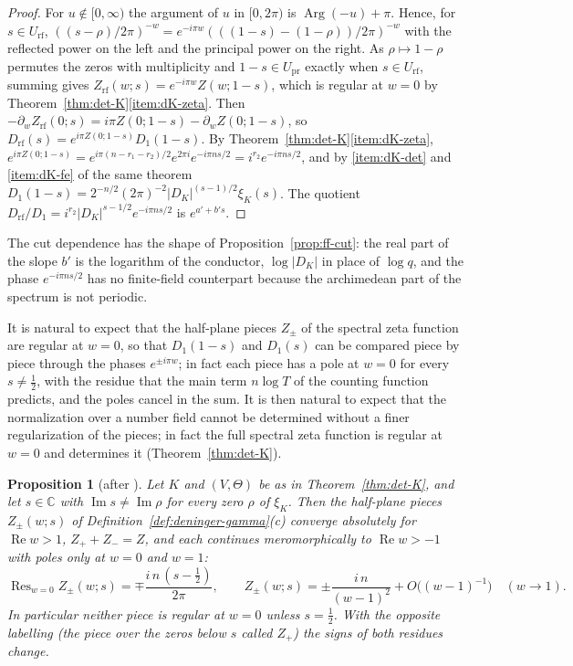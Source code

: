 \documentclass[11pt]{amsart}
\theoremstyle{plain}
\newtheorem{proposition}[theorem]{Proposition}
\theoremstyle{definition}
\theoremstyle{remark}
\numberwithin{equation}{section}
\newcommand{\C}{\mathbb{C}}
\DeclareMathOperator{\Ima}{Im}
\DeclareMathOperator{\Rea}{Re}
\renewcommand{\Re}{\Rea}
\renewcommand{\Im}{\Ima}
\begin{document}
\begin{proof}
For $u\notin[0,\infty)$ the argument of $u$ in $[0,2\pi)$ is
$\operatorname{Arg}(-u)+\pi$. Hence, for $s\in U_{\mathrm{rf}}$,
$((s-\rho)/2\pi)^{-w}=e^{-i\pi w}(((1-s)-(1-\rho))/2\pi)^{-w}$ with the
reflected power on the left and the principal power on the right. As
$\rho\mapsto1-\rho$ permutes the zeros with multiplicity and
$1-s\in U_{\mathrm{pr}}$ exactly when $s\in U_{\mathrm{rf}}$, summing
gives $Z_{\mathrm{rf}}(w;s)=e^{-i\pi w}Z(w;1-s)$, which is regular at
$w=0$ by Theorem~\ref{thm:det-K}\ref{item:dK-zeta}. Then
$-\partial_wZ_{\mathrm{rf}}(0;s)=i\pi Z(0;1-s)-\partial_wZ(0;1-s)$, so
$D_{\mathrm{rf}}(s)=e^{i\pi Z(0;1-s)}D_1(1-s)$. By
Theorem~\ref{thm:det-K}\ref{item:dK-zeta},
$e^{i\pi Z(0;1-s)}=e^{i\pi(n-r_1-r_2)/2}e^{2\pi i}e^{-i\pi ns/2}
=i^{r_2}e^{-i\pi ns/2}$, and by \ref{item:dK-det} and
\ref{item:dK-fe} of the same theorem
$D_1(1-s)=2^{-n/2}(2\pi)^{-2}|D_K|^{(s-1)/2}\xi_K(s)$. The quotient
$D_{\mathrm{rf}}/D_1=i^{r_2}|D_K|^{s-1/2}e^{-i\pi ns/2}$ is
$e^{a'+b's}$.
\end{proof}

The cut dependence has the shape of Proposition~\ref{prop:ff-cut}: the
real part of the slope $b'$ is the logarithm of the conductor, $\log
|D_K|$ in place of $\log q$, and the phase $e^{-i\pi ns/2}$ has no
finite-field counterpart because the archimedean part of the spectrum
is not periodic.

It is natural to expect that the half-plane pieces $Z_\pm$ of the
spectral zeta function are regular at $w=0$, so that $D_1(1-s)$ and
$D_1(s)$ can be compared piece by piece through the phases
$e^{\pm i\pi w}$; in fact each piece has a pole at $w=0$ for every
$s\ne\tfrac12$, with the residue that the main term
$n\log T$ of the counting function predicts, and the poles cancel in
the sum. It is then natural to expect that the normalization over a
number field cannot be determined without a finer regularization of
the pieces; in fact the full spectral zeta function is regular at $w=0$
and determines it (Theorem~\ref{thm:det-K}).

\begin{proposition}[{after \cite[(1.3)--(1.7), pp.~4--6, and
Theorem~(7.20), p.~37]{Deninger1994Motivic}}]\label{prop:Zpm}
Let $K$ and $(V,\Theta)$ be as in Theorem~\ref{thm:det-K}, and let
$s\in\C$ with $\Im s\ne\Im\rho$ for every zero $\rho$ of $\xi_K$. Then
the half-plane pieces $Z_\pm(w;s)$ of
Definition~\ref{def:deninger-gamma}(c) converge absolutely for
$\Re w>1$, $Z_++Z_-=Z$, and each continues meromorphically to
$\Re w>-1$ with poles only at $w=0$ and $w=1$:
\[
\operatorname{Res}_{w=0}Z_\pm(w;s)=\mp\frac{i\,n\,(s-\frac12)}{2\pi},
\qquad
Z_\pm(w;s)=\pm\frac{i\,n}{(w-1)^2}+O\bigl((w-1)^{-1}\bigr)
\quad(w\to1).
\]
In particular neither piece is regular at $w=0$ unless $s=\tfrac12$.
With the opposite labelling (the piece over the zeros below $s$ called
$Z_+$) the signs of both residues change.
\end{proposition}
\end{document}
